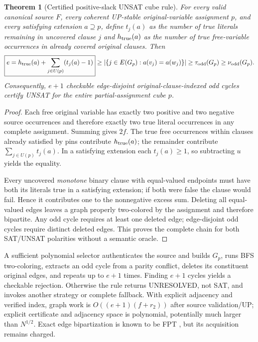 \documentclass[11pt]{article}
\newtheorem{theorem}{Theorem}
\begin{document}
\begin{theorem}[Certified positive-slack UNSAT cube rule]
For every valid canonical source $F$, every coherent UP-stable original-variable assignment $p$, and \emph{every} satisfying extension $a\supseteq p$, define $t_j(a)$ as the number of true literals remaining in uncovered clause $j$ and $h_{\rm true}(a)$ as the number of true free-variable occurrences in already covered original clauses. Then
\[
\boxed{e=h_{\rm true}(a)+\sum_{j\in U(p)}(t_j(a)-1)}
\ge \left|\{j\in E(G_p):a(v_j)=a(w_j)\}\right|
\ge\tau_{\rm odd}(G_p)\ge\nu_{\rm odd}(G_p).
\]
Consequently, $e+1$ checkable \emph{edge-disjoint original-clause-indexed odd cycles} certify UNSAT for the entire partial-assignment cube $p$.
\end{theorem}
\begin{proof}
Each free original variable has exactly two positive and two negative source occurrences and therefore exactly two true literal occurrences in any complete assignment. Summing gives $2f$. The true free occurrences within clauses already satisfied by pins contribute $h_{\rm true}(a)$; the remainder contribute $\sum_{j\in U(p)}t_j(a)$. In a satisfying extension each $t_j(a)\ge1$, so subtracting $u$ yields the equality.

Every uncovered \emph{monotone} binary clause with equal-valued endpoints must have both its literals true in a satisfying extension; if both were false the clause would fail. Hence it contributes one to the nonnegative excess sum. Deleting all equal-valued edges leaves a graph properly two-colored by the assignment and therefore bipartite. Any odd cycle requires at least one deleted edge; edge-disjoint odd cycles require distinct deleted edges. This proves the complete chain for both SAT/UNSAT polarities without a semantic oracle.
\end{proof}
\noindent A sufficient polynomial selector authenticates the source and builds $G_p$, runs BFS two-coloring, extracts an odd cycle from a parity conflict, deletes its constituent original edges, and repeats up to $e+1$ times. Finding $e+1$ cycles yields a checkable rejection. Otherwise the rule returns UNRESOLVED, not SAT, and invokes another strategy or complete fallback. With explicit adjacency and verified index, graph work is $O((e+1)(f+r_2))$ after source validation/UP; explicit certificate and adjacency space is polynomial, potentially much larger than $N^{1/2}$. Exact edge bipartization is known to be FPT \cite{guo2006}, but its acquisition remains charged.
\end{document}
